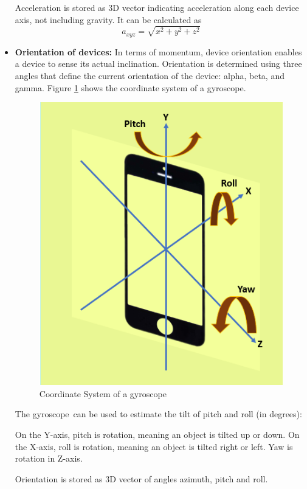 \begin{itemize}
\vspace{0.5cm}
Acceleration is stored as 3D vector indicating acceleration along each device axis, not including gravity. It can be calculated as
    \begin{equation}
        a_{xyz}=\sqrt{x^2+y^2+z^2}
    \end{equation}
    
     \item \textbf{Orientation of devices:} 
     In terms of momentum, device orientation enables a device to sense its actual inclination. Orientation is determined using three angles that define the current orientation of the device: alpha, beta, and gamma. Figure \ref{fig:Gyro} shows the coordinate system of a gyroscope.
     
     \begin{figure}[!ht]
     \centering
     \includegraphics[scale=0.5]{Chap4/Orientation.PNG}
     \caption{Coordinate System of a gyroscope}
     \label{fig:Gyro}
     \end{figure}
     
 \vspace{0.5cm}    
The gyroscope can be used to estimate the tilt of pitch and roll (in degrees): 

On the Y-axis, pitch is rotation, meaning an object is tilted up or down. 
On the X-axis, roll is rotation, meaning an object is tilted right or left.
Yaw is rotation in Z-axis.

     Orientation is stored as 3D vector of angles azimuth, pitch and roll.
\end{itemize}


